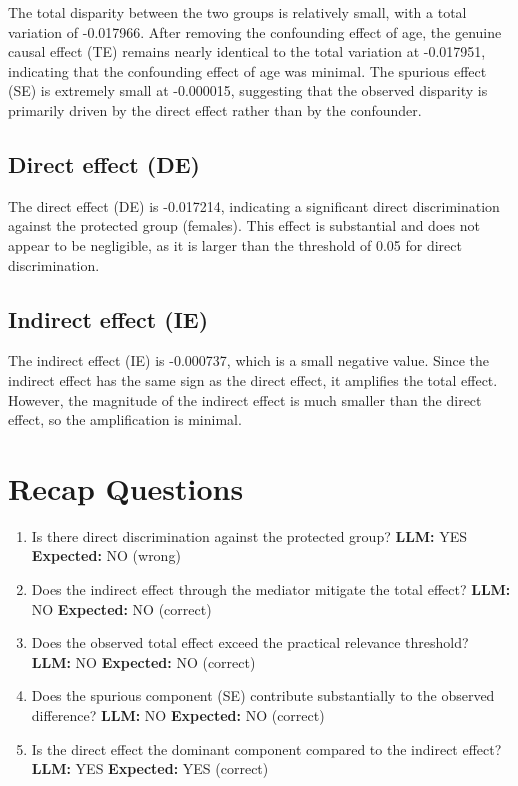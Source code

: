 \documentclass[11pt]{article}
\begin{document}
The total disparity between the two groups is relatively small, with a total variation of -0.017966. After removing the confounding effect of age, the genuine causal effect (TE) remains nearly identical to the total variation at -0.017951, indicating that the confounding effect of age was minimal. The spurious effect (SE) is extremely small at -0.000015, suggesting that the observed disparity is primarily driven by the direct effect rather than by the confounder.

\subsection{Direct effect (DE)}

The direct effect (DE) is -0.017214, indicating a significant direct discrimination against the protected group (females). This effect is substantial and does not appear to be negligible, as it is larger than the threshold of 0.05 for direct discrimination.

\subsection{Indirect effect (IE)}

The indirect effect (IE) is -0.000737, which is a small negative value. Since the indirect effect has the same sign as the direct effect, it amplifies the total effect. However, the magnitude of the indirect effect is much smaller than the direct effect, so the amplification is minimal.

\section{Recap Questions}

\begin{enumerate}
\item Is there direct discrimination against the protected group? \textbf{LLM:} YES \quad \textbf{Expected:} NO \quad (wrong)
\item Does the indirect effect through the mediator mitigate the total effect? \textbf{LLM:} NO \quad \textbf{Expected:} NO \quad (correct)
\item Does the observed total effect exceed the practical relevance threshold? \textbf{LLM:} NO \quad \textbf{Expected:} NO \quad (correct)
\item Does the spurious component (SE) contribute substantially to the observed difference? \textbf{LLM:} NO \quad \textbf{Expected:} NO \quad (correct)
\item Is the direct effect the dominant component compared to the indirect effect? \textbf{LLM:} YES \quad \textbf{Expected:} YES \quad (correct)
\end{enumerate}
\end{document}
